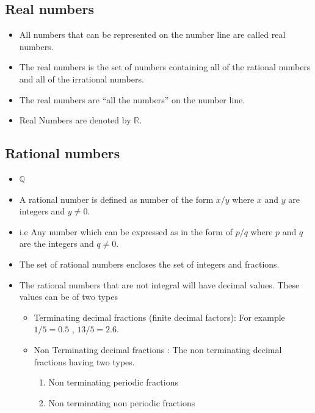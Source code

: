 \documentclass[]{book}
\providecommand{\tightlist}{%
  \setlength{\itemsep}{0pt}\setlength{\parskip}{0pt}}
\begin{document}
\hypertarget{real-numbers}{%
\subsection{Real numbers}\label{real-numbers}}

\begin{itemize}
\tightlist
\item
  All numbers that can be represented on the number line are called real numbers.
\item
  The real numbers is the set of numbers containing all of the rational numbers and all of the irrational numbers.
\item
  The real numbers are ``all the numbers'' on the number line.
\item
  Real Numbers are denoted by \(\mathbb{R}\).
\end{itemize}

\hypertarget{rational-numbers}{%
\subsection{Rational numbers}\label{rational-numbers}}

\begin{itemize}
\item
  \(\mathbb{Q}\)
\item
  A rational number is defined as number of the form \(x/y\) where \(x\) and \(y\) are integers and \(y \neq 0\).
\item
  i.e Any number which can be expressed as in the form of \(p/q\) where \(p\) and \(q\) are the integers and \(q \neq 0\).
\item
  The set of rational numbers encloses the set of integers and fractions.
\item
  The rational numbers that are not integral will have decimal values. These values can be of two types

  \begin{itemize}
  \tightlist
  \item
    Terminating decimal fractions (finite decimal factors): For example \(1/5 = 0.5\) , \(13/5 = 2.6\).
  \item
    Non Terminating decimal fractions : The non terminating decimal fractions having two types.

    \begin{enumerate}
    \def\labelenumi{\roman{enumi})}
    \tightlist
    \item
      Non terminating periodic fractions
    \item
      Non terminating non periodic fractions
    \end{enumerate}
  \end{itemize}
\end{itemize}
\end{document}
